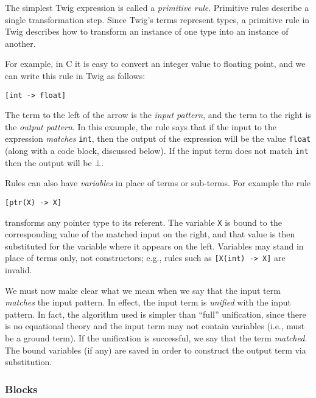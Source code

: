 The simplest Twig expression is called a \emph{primitive rule}.  Primitive rules describe a single transformation step. Since Twig's terms represent types, a primitive rule in Twig describes how to transform an instance of one type into an instance of another.

For example, in C it is easy to convert an integer value to floating point, and we can write this rule in Twig as follows:

\begin{verbatim}
[int -> float]
\end{verbatim}

The term to the left of the arrow is the \emph{input pattern}, and the term to the right is the \emph{output pattern}. In this example, the rule says that if the input to the expression \emph{matches} \texttt{int}, then the output of the expression will be the value \texttt{float} (along with a code block, discussed below). If the input term does not match \texttt{int} then the output will be $\bot$.

Rules can also have \emph{variables} in place of terms or sub-terms. For example the rule

\begin{verbatim}
[ptr(X) -> X]
\end{verbatim}

transforms any pointer type to its referent. The variable \texttt{X} is bound to the corresponding value of the matched input on the right, and that value is then substituted for the variable where it appears on the left. Variables may stand in place of terms only, not constructors; e.g., rules such as \texttt{[X(int) -> X]} are invalid.

We must now make clear what we mean when we say that the input term \emph{matches} the input pattern. In effect, the input term is \emph{unified}\cite{baader98rewriting} with the input pattern. In fact, the algorithm used is simpler than ``full'' unification, since there is no equational theory and the input term may not contain variables (i.e., must be a ground term). If the unification is successful, we say that the term \emph{matched}. The bound variables (if any) are saved in order to construct the output term via substitution.


\subsubsection{Blocks}

